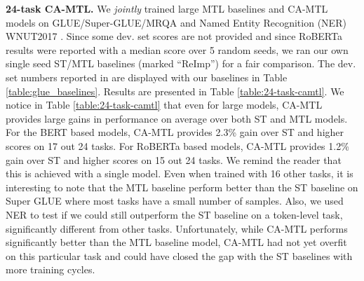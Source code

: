 \documentclass{article} \usepackage{iclr2021_conference,times}
\begin{document}
\textbf{24-task CA-MTL.} We \emph{jointly} trained large MTL baselines and CA-MTL models on GLUE/Super-GLUE/MRQA and Named Entity Recognition (NER) WNUT2017 \citep{derczynski-etal-2017-results}. Since some dev. set scores are not provided and since RoBERTa results were reported with a median score over 5 random seeds, we ran our own single seed ST/MTL baselines (marked ``ReImp'') for a fair comparison. The dev. set numbers reported in \cite{roberta} are displayed with our baselines in Table \ref{table:glue_baselines}.  Results are presented in Table \ref{table:24-task-camtl}. We notice in Table \ref{table:24-task-camtl} that even for large models, CA-MTL provides large gains in performance on average over both ST and MTL models. For the BERT based models, CA-MTL provides 2.3\% gain over ST and higher scores on 17 out 24 tasks. For RoBERTa based models, CA-MTL provides 1.2\% gain over ST and higher scores on 15 out 24 tasks. We remind the reader that this is achieved with a single model. Even when trained with 16 other tasks, it is interesting to note that the MTL baseline perform better than the ST baseline on Super GLUE where most tasks have a small number of samples. Also, we used NER to test if we could still outperform the ST baseline on a token-level task, significantly different from other tasks. Unfortunately, while CA-MTL performs significantly better than the MTL baseline model, CA-MTL had not yet overfit on this particular task and could have closed the gap with the ST baselines with more training cycles.
\end{document}

